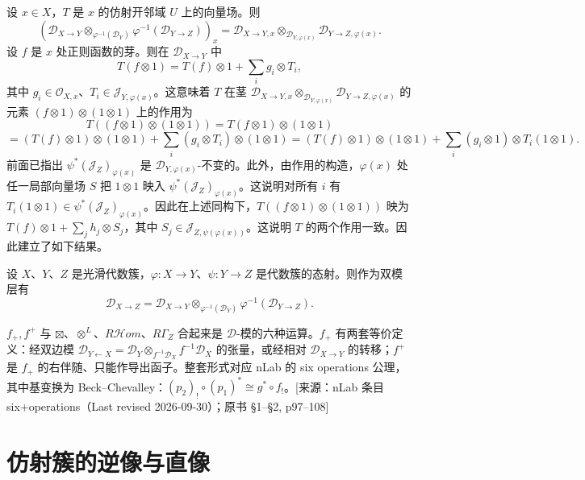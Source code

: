 设 $x\in X$，$T$ 是 $x$ 的仿射开邻域 $U$ 上的向量场。则
$$(\mathcal{D}_{X\to Y}\otimes_{\varphi^{-1}(\mathcal{D}_Y)}\varphi^{-1}(\mathcal{D}_{Y\to Z}))_x
=\mathcal{D}_{X\to Y,x}\otimes_{\mathcal{D}_{Y,\varphi(x)}}\mathcal{D}_{Y\to Z,\varphi(x)}.$$
设 $f$ 是 $x$ 处正则函数的芽。则在 $\mathcal{D}_{X\to Y}$ 中
$$T(f\otimes 1)=T(f)\otimes 1+\sum_i g_i\otimes T_i,$$
其中 $g_i\in\mathcal{O}_{X,x}$、$T_i\in\mathcal{J}_{Y,\varphi(x)}$。这意味着 $T$ 在茎
$\mathcal{D}_{X\to Y,x}\otimes_{\mathcal{D}_{Y,\varphi(x)}}\mathcal{D}_{Y\to Z,\varphi(x)}$ 的元素
$(f\otimes 1)\otimes(1\otimes 1)$ 上的作用为
$$T((f\otimes 1)\otimes(1\otimes 1))=T(f\otimes 1)\otimes(1\otimes 1)$$
$$=(T(f)\otimes 1)\otimes(1\otimes 1)+\sum_i(g_i\otimes T_i)\otimes(1\otimes 1)
=(T(f)\otimes 1)\otimes(1\otimes 1)+\sum_i(g_i\otimes 1)\otimes T_i(1\otimes 1).$$
前面已指出 $\psi^*(\mathcal{J}_Z)_{\varphi(x)}$ 是 $\mathcal{D}_{Y,\varphi(x)}$-不变的。此外，由作用的构造，$\varphi(x)$ 处任一局部向量场 $S$ 把 $1\otimes 1$ 映入 $\psi^*(\mathcal{J}_Z)_{\varphi(x)}$。这说明对所有 $i$ 有 $T_i(1\otimes 1)\in\psi^*(\mathcal{J}_Z)_{\varphi(x)}$。因此在上述同构下，$T((f\otimes 1)\otimes(1\otimes 1))$ 映为
$T(f)\otimes 1+\sum_j h_j\otimes S_j$，其中 $S_j\in\mathcal{J}_{Z,\psi(\varphi(x))}$。这说明 $T$ 的两个作用一致。因此建立了如下结果。

\begin{proposition}\label{prop:4.1.7}
设 $X$、$Y$、$Z$ 是光滑代数簇，$\varphi:X\to Y$、$\psi:Y\to Z$ 是代数簇的态射。则作为双模层有
$$\mathcal{D}_{X\to Z}=\mathcal{D}_{X\to Y}\otimes_{\varphi^{-1}(\mathcal{D}_Y)}\varphi^{-1}(\mathcal{D}_{Y\to Z}).$$
\end{proposition}
\begin{annote}
$f_+,f^+$ 与 $\boxtimes$、$\otimes^L$、$R\mathcal H om$、$R\Gamma_Z$ 合起来是 $\mathcal D$-模的六种运算。$f_+$ 有两套等价定义：经双边模 $\mathcal D_{Y\leftarrow X}=\mathcal D_Y\otimes_{f^{-1}\mathcal D_X}f^{-1}\mathcal D_X$ 的张量，或经相对 $\mathcal D_{X\to Y}$ 的转移；$f^+$ 是 $f_+$ 的右伴随、只能作导出函子。整套形式对应 nLab 的 six operations 公理，其中基变换为 Beck–Chevalley：$(p_2)_!\circ(p_1)^*\cong g^*\circ f_!$。[来源：nLab 条目 six+operations（Last revised 2026-09-30）；原书 §1–§2, p97–108]
\end{annote}



\section{仿射簇的逆像与直像}


